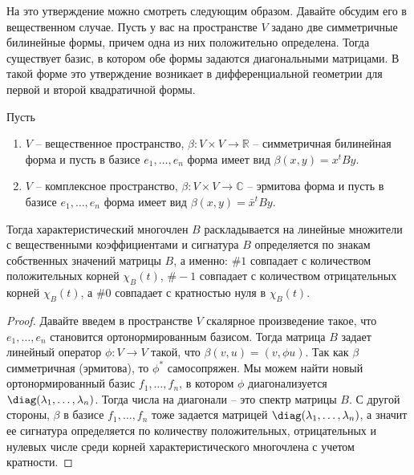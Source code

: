 На это утверждение можно смотреть следующим образом.
Давайте обсудим его в вещественном случае.
Пусть у вас на пространстве $V$ задано две симметричные билинейные формы, причем одна из них положительно определена.
Тогда существует базис, в котором обе формы задаются диагональными матрицами.
В такой форме это утверждение возникает в дифференциальной геометрии для первой и второй квадратичной формы.

\begin{claim}
Пусть 
\begin{enumerate}
\item
$V$ -- вещественное пространство, $\beta\colon V\times V\to \mathbb R$ -- симметричная билинейная форма и пусть в базисе $e_1,\ldots,e_n$ форма имеет вид $\beta(x, y) = x^t B y$.

\item
$V$ -- комплексное пространство, $\beta\colon V\times V\to \mathbb C$ -- эрмитова форма и пусть в базисе $e_1,\ldots,e_n$ форма имеет вид $\beta(x, y) = \bar x^t B y$.

\end{enumerate}
Тогда характеристический многочлен $B$ раскладывается на линейные множители с вещественными коэффициентами и сигнатура $B$ определяется по знакам собственных значений матрицы $B$, а именно: $\#1$ совпадает с количеством положительных корней $\chi_B(t)$, $\#-1$ совпадает с количеством отрицательных корней $\chi_B(t)$, а $\#0$ совпадает с кратностью нуля в $\chi_B(t)$.
\end{claim}
\begin{proof}
Давайте введем в пространстве $V$ скалярное произведение такое, что $e_1,\ldots,e_n$ становится ортонормированным базисом.
Тогда матрица $B$ задает линейный оператор $\phi\colon V \to V$ такой, что $\beta(v, u) = (v, \phi u)$.
Так как $\beta$ симметричная (эрмитова), то $\phi^*$ самосопряжен.
Мы можем найти новый ортонормированный базис $f_1,\ldots,f_n$, в котором $\phi$ диагонализуется $\diag(\lambda_1,\ldots,\lambda_n)$.
Тогда числа на диагонали -- это спектр матрицы $B$.
С другой стороны, $\beta$ в базисе $f_1,\ldots,f_n$ тоже задается матрицей $\diag(\lambda_1,\ldots,\lambda_n)$, а значит ее сигнатура определяется по количеству положительных, отрицательных и нулевых числе среди корней характеристического многочлена с учетом кратности.
\end{proof}
